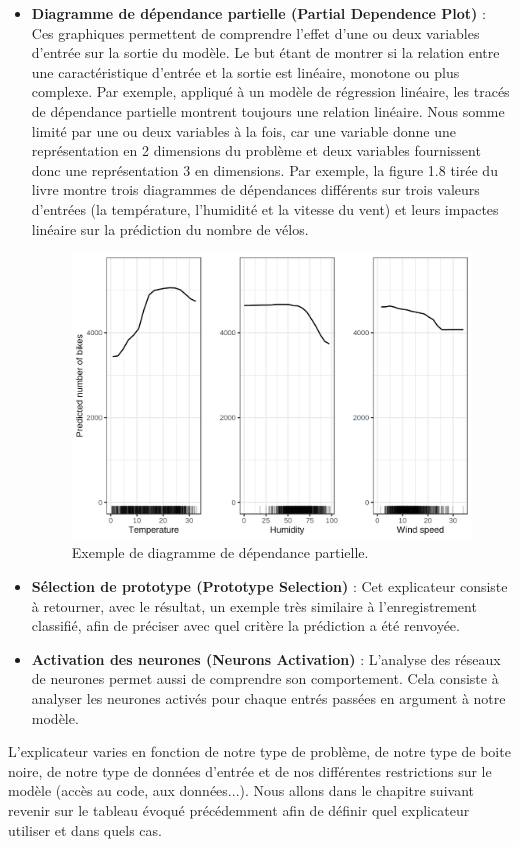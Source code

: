\begin{itemize}
    \item \textbf{Diagramme de dépendance partielle (Partial Dependence Plot)} : Ces graphiques permettent de comprendre l'effet d'une ou deux variables d'entrée sur la sortie du modèle. Le but étant de  montrer si la relation entre une caractéristique d'entrée et la sortie est linéaire, monotone ou plus complexe. Par exemple, appliqué à un modèle de régression linéaire, les tracés de dépendance partielle montrent toujours une relation linéaire. Nous somme limité par une ou deux variables à la fois, car une variable donne une représentation en 2 dimensions du problème et deux variables fournissent donc une représentation 3 en dimensions. Par exemple, la figure 1.8 tirée du livre \cite{molnar2019} montre trois diagrammes de dépendances différents sur trois valeurs d'entrées (la température, l'humidité et la vitesse du vent) et leurs impactes linéaire sur la prédiction du nombre de vélos.
    \begin{figure}[h]
        \includegraphics[scale=0.17]{src_img/partialDependencePlot.png}
        \caption{Exemple de diagramme de dépendance partielle.}
        \label{partialDependencePlot}
    \end{figure}
    
    \item \textbf{Sélection de prototype (Prototype Selection)} : Cet explicateur consiste à retourner, avec le résultat, un exemple très similaire à l'enregistrement classifié, afin de préciser avec quel critère la prédiction a été renvoyée.
    
    \item \textbf{Activation des neurones (Neurons Activation)} : L'analyse des réseaux de neurones permet aussi de comprendre son comportement. Cela consiste à analyser les neurones activés pour chaque entrés passées en argument à notre modèle.
\end{itemize}

L'explicateur varies en fonction de notre type de problème, de notre type de boite noire, de notre type de données d'entrée et de nos différentes restrictions sur le modèle (accès au code, aux données...). Nous allons dans le chapitre suivant revenir sur le tableau évoqué précédemment \cite{surveyExplaining} afin de définir quel explicateur utiliser et dans quels cas. 